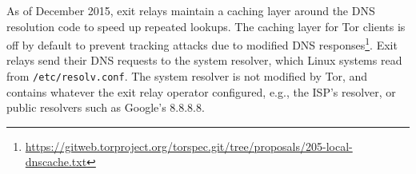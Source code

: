 As of December 2015, exit relays maintain a caching layer
around the DNS resolution code to speed up repeated lookups.
The caching layer for Tor clients is off by default to prevent tracking attacks
due to modified DNS
responses\footnote{\url{https://gitweb.torproject.org/torspec.git/tree/proposals/205-local-dnscache.txt}}. 
Exit relays send
their DNS requests to the system resolver, which Linux systems read from
\texttt{/etc/resolv.conf}.  The system resolver is not modified by Tor, and
contains whatever the exit relay operator configured, e.g., the ISP's resolver,
or public resolvers such as Google's 8.8.8.8.
